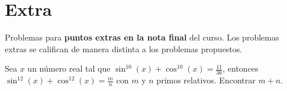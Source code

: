 \section{Extra}

Problemas para \textbf{puntos extras en la nota final} del curso.
Los problemas extras se califican de manera distinta a los problemas propuestos.

\begin{problem}
    Sea $x$ un número real tal que $\sin^{10}(x) + \cos^{10}(x) = \frac{11}{36}$, entonces $\sin^{12}(x) + \cos^{12}(x) = \frac{m}{n}$
    con $m$ y $n$ primos relativos.
    Encontrar $m + n$.
\end{problem}